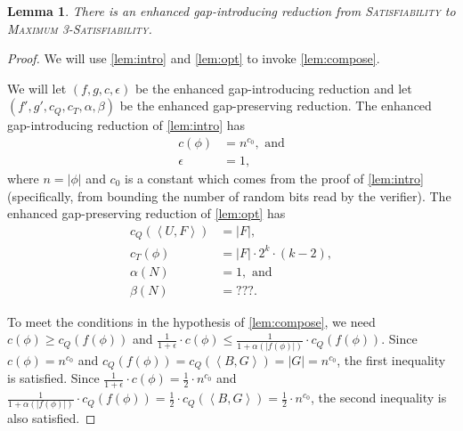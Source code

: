 \documentclass[]{article}
\theoremstyle{plain}
\newtheorem{lemma}{Lemma}
\theoremstyle{definition}
\newcommand{\pair}[2]{{\left\langle{#1}, {#2}\right\rangle}}
\begin{document}
\begin{lemma}\label{lem:gap3}
  There is an enhanced gap-introducing reduction from \textsc{Satisfiability} to \textsc{Maximum 3-Satisfiability}.
\end{lemma}
\begin{proof}
  We will use \autoref{lem:intro} and \autoref{lem:opt} to invoke \autoref{lem:compose}.

  We will let $(f, g, c, \epsilon)$ be the enhanced gap-introducing reduction and let $(f', g', c_Q, c_T, \alpha, \beta)$ be the enhanced gap-preserving reduction.
  The enhanced gap-introducing reduction of \autoref{lem:intro} has
  \begin{align*}
    c(\phi) & = n^{c_0}, \text{ and} \\
    \epsilon & = 1,
  \end{align*}
  where $n = |\phi|$ and $c_0$ is a constant which comes from the proof of \autoref{lem:intro} (specifically, from bounding the number of random bits read by the verifier).
  The enhanced gap-preserving reduction of \autoref{lem:opt} has
  \begin{align*}
    c_Q(\pair{U}{F}) & = |F|, \\
    c_T(\phi) & = |F| \cdot 2^k \cdot (k - 2), \\
    \alpha(N) & = 1, \text{ and} \\
    \beta(N) & = ???.
  \end{align*}

  To meet the conditions in the hypothesis of \autoref{lem:compose}, we need $c(\phi) \geq c_Q(f(\phi))$ and $\frac{1}{1 + \epsilon} \cdot c(\phi) \leq \frac{1}{1 + \alpha(|f(\phi)|)} \cdot c_Q(f(\phi))$.
  Since $c(\phi) = n^{c_0}$ and $c_Q(f(\phi)) = c_Q(\pair{B}{G}) = |G| = n^{c_0}$, the first inequality is satisfied.
  Since $\frac{1}{1 + \epsilon} \cdot c(\phi) = \frac{1}{2} \cdot n^{c_0}$ and $\frac{1}{1 + \alpha(|f(\phi)|)} \cdot c_Q(f(\phi)) = \frac{1}{2} \cdot c_Q(\pair{B}{G}) = \frac{1}{2} \cdot n^{c_0}$, the second inequality is also satisfied.


\end{proof}
\end{document}

